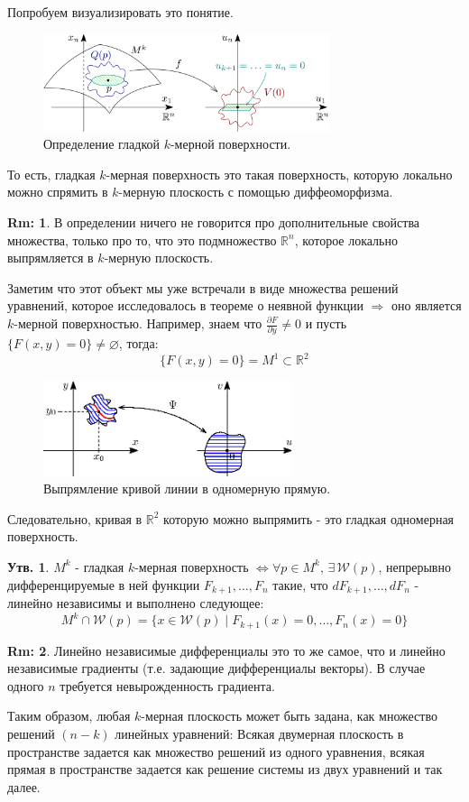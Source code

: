 \documentclass[12pt]{article}
\newcommand{\MR}{\mathbb{R}}
\newcommand{\MW}{\mathcal{W}}
\newcommand{\VN}{\varnothing}
\theoremstyle{definition}
\newtheorem{rem}{Rm:}
\newtheorem{prop}{Утв.}
\begin{document}
Попробуем визуализировать это понятие.
\begin{figure}[H]
	\centering
	\includegraphics[width=0.75\textwidth]{19_2.png}
	\caption{Определение гладкой $k$-мерной поверхности.}
	\label{19_2}
\end{figure}
То есть, гладкая $k$-мерная поверхность это такая поверхность, которую локально можно спрямить в $k$-мерную плоскость с помощью диффеоморфизма. 
\begin{rem}
	В определении ничего не говорится про дополнительные свойства множества, только про то, что это подмножество $\MR^n$, которое локально выпрямляется в $k$-мерную плоскость.
\end{rem}
Заметим что этот объект мы уже встречали в виде множества решений уравнений, которое исследовалось в теореме о неявной функции $\Rightarrow$ оно является $k$-мерной поверхностью. Например, знаем что $\tfrac{\partial F}{\partial y} \neq 0$ и пусть $\{F(x,y) = 0\} \neq \VN$, тогда:
$$
	\{F(x,y) = 0\} = M^1 \subset \MR^2
$$
\begin{figure}[H]
	\centering
	\includegraphics[width=0.65\textwidth]{19_3.eps}
	\caption{Выпрямление кривой линии в одномерную прямую.}
	\label{19_3}
\end{figure}
Следовательно, кривая в $\MR^2$ которую можно выпрямить - это гладкая одномерная поверхность.
\begin{prop}
	$M^k$ - гладкая $k$-мерная поверхность $\Leftrightarrow \forall p \in M^k, \, \exists \, \MW(p)$, непрерывно дифференцируемые в ней функции $F_{k+1}, \dotsc, F_n$ такие, что $dF_{k+1}, \dotsc, dF_n$ - линейно независимы и выполнено следующее:
	$$
		M^k \cap \MW(p) = \{x \in \MW(p) \mid F_{k+1}(x) = 0, \dotsc, F_n(x) = 0\}
	$$
\end{prop}
\begin{rem}
	Линейно независимые дифференциалы это то же самое, что и линейно независимые градиенты (т.е. задающие дифференциалы векторы). В случае одного $n$ требуется невырожденность градиента.
\end{rem}
Таким образом, любая $k$-мерная плоскость может быть задана, как множество решений $(n-k)$ линейных уравнений: Всякая двумерная плоскость в пространстве задается как множество решений из одного уравнения, всякая прямая в пространстве задается как решение системы из двух уравнений и так далее.
\end{document}
